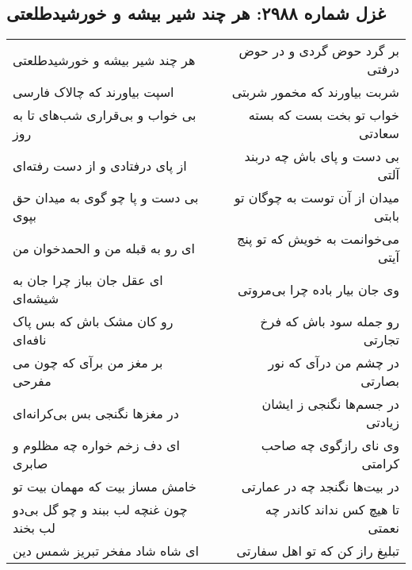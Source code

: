 \begin{center}
\section*{غزل شماره ۲۹۸۸: هر چند شیر بیشه و خورشیدطلعتی}
\label{sec:2988}
\begin{longtable}{l p{0.5cm} r}
هر چند شیر بیشه و خورشیدطلعتی
&&
بر گرد حوض گردی و در حوض درفتی
\\
اسپت بیاورند که چالاک فارسی
&&
شربت بیاورند که مخمور شربتی
\\
بی خواب و بی‌قراری شب‌های تا به روز
&&
خواب تو بخت بست که بسته سعادتی
\\
از پای درفتادی و از دست رفته‌ای
&&
بی دست و پای باش چه دربند آلتی
\\
بی دست و پا چو گوی به میدان حق بپوی
&&
میدان از آن توست به چوگان تو بابتی
\\
ای رو به قبله من و الحمدخوان من
&&
می‌خوانمت به خویش که تو پنج آیتی
\\
ای عقل جان بباز چرا جان به شیشه‌ای
&&
وی جان بیار باده چرا بی‌مروتی
\\
رو کان مشک باش که بس پاک نافه‌ای
&&
رو جمله سود باش که فرخ تجارتی
\\
بر مغز من برآی که چون می مفرحی
&&
در چشم من درآی که نور بصارتی
\\
در مغزها نگنجی بس بی‌کرانه‌ای
&&
در جسم‌ها نگنجی ز ایشان زیادتی
\\
ای دف زخم خواره چه مظلوم و صابری
&&
وی نای رازگوی چه صاحب کرامتی
\\
خامش مساز بیت که مهمان بیت تو
&&
در بیت‌ها نگنجد چه در عمارتی
\\
چون غنچه لب ببند و چو گل بی‌دو لب بخند
&&
تا هیچ کس نداند کاندر چه نعمتی
\\
ای شاه شاد مفخر تبریز شمس دین
&&
تبلیغ راز کن که تو اهل سفارتی
\\
\end{longtable}
\end{center}
